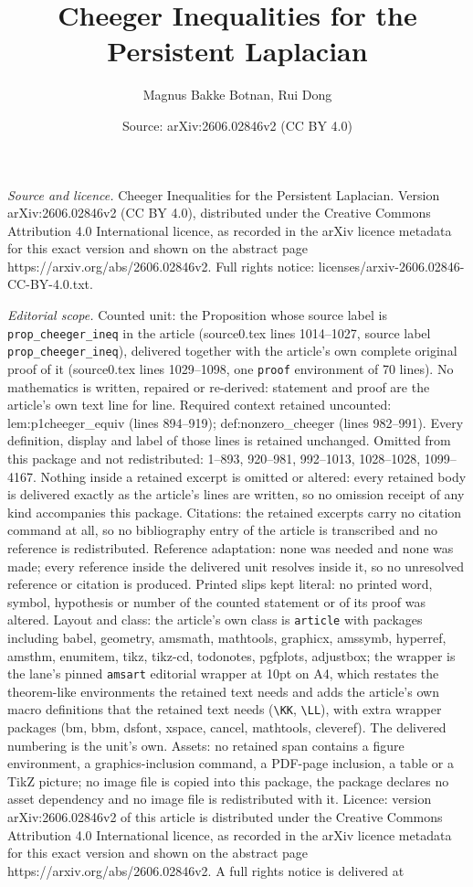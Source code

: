 \documentclass[10pt,a4paper]{amsart}
\title[Cheeger Inequalities for the Persistent Laplacian]{Cheeger Inequalities for the Persistent Laplacian}
\author{Magnus Bakke Botnan, Rui Dong}
\date{Source: arXiv:2606.02846v2 (CC BY 4.0)}
\begin{document}
\maketitle

\noindent\emph{Source and licence.} Cheeger Inequalities for the Persistent Laplacian. Version arXiv:2606.02846v2 (CC BY 4.0), distributed under the Creative Commons Attribution 4.0 International licence, as recorded in the arXiv licence metadata for this exact version and shown on the abstract page https://arxiv.org/abs/2606.02846v2. Full rights notice: licenses/arxiv-2606.02846-CC-BY-4.0.txt.\par\smallskip

\noindent\textit{Editorial scope.} Counted unit: the Proposition whose source label is \texttt{prop\_cheeger\_ineq} in the article (source0.tex lines 1014--1027, source label \texttt{prop\_cheeger\_ineq}), delivered together with the article's own complete original proof of it (source0.tex lines 1029--1098, one \texttt{proof} environment of 70 lines). No mathematics is written, repaired or re-derived: statement and proof are the article's own text line for line. Required context retained uncounted: lem:p1cheeger\_equiv (lines 894--919); def:nonzero\_cheeger (lines 982--991). Every definition, display and label of those lines is retained unchanged. Omitted from this package and not redistributed: 1--893, 920--981, 992--1013, 1028--1028, 1099--4167. Nothing inside a retained excerpt is omitted or altered: every retained body is delivered exactly as the article's lines are written, so no omission receipt of any kind accompanies this package. Citations: the retained excerpts carry no citation command at all, so no bibliography entry of the article is transcribed and no reference is redistributed. Reference adaptation: none was needed and none was made; every reference inside the delivered unit resolves inside it, so no unresolved reference or citation is produced. Printed slips kept literal: no printed word, symbol, hypothesis or number of the counted statement or of its proof was altered. Layout and class: the article's own class is \texttt{article} with packages including babel, geometry, amsmath, mathtools, graphicx, amssymb, hyperref, amsthm, enumitem, tikz, tikz-cd, todonotes, pgfplots, adjustbox; the wrapper is the lane's pinned \texttt{amsart} editorial wrapper at 10pt on A4, which restates the theorem-like environments the retained text needs and adds the article's own macro definitions that the retained text needs (\texttt{\textbackslash KK}, \texttt{\textbackslash LL}), with extra wrapper packages (bm, bbm, dsfont, xspace, cancel, mathtools, cleveref). The delivered numbering is the unit's own. Assets: no retained span contains a figure environment, a graphics-inclusion command, a PDF-page inclusion, a table or a TikZ picture; no image file is copied into this package, the package declares no asset dependency and no image file is redistributed with it. Licence: version arXiv:2606.02846v2 of this article is distributed under the Creative Commons Attribution 4.0 International licence, as recorded in the arXiv licence metadata for this exact version and shown on the abstract page https://arxiv.org/abs/2606.02846v2. A full rights notice is delivered at 
\end{document}
